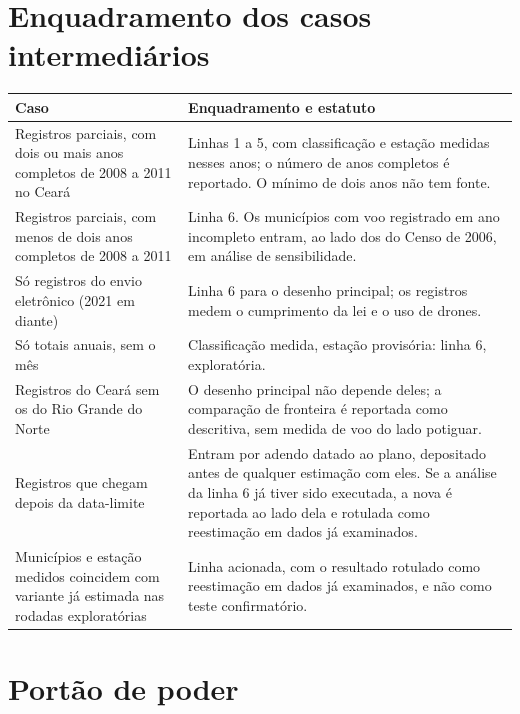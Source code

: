 \begin{apendicesenv}
\section{Enquadramento dos casos intermediários}

\begin{quadro}[htb]
\caption{\label{qua:casos}Casos que o Quadro~\ref{qua:regra} não nomeia}
\centering
\footnotesize
\begin{tabular}{@{}p{5.2cm}p{9.3cm}@{}}
\toprule
Caso & Enquadramento e estatuto \\
\midrule
Registros parciais, com dois ou mais anos completos de 2008 a 2011 no Ceará &
Linhas 1 a 5, com classificação e estação medidas nesses anos; o número de anos completos é reportado. O mínimo de dois anos não tem fonte. \\
Registros parciais, com menos de dois anos completos de 2008 a 2011 &
Linha 6. Os municípios com voo registrado em ano incompleto entram, ao lado dos do Censo de 2006, em análise de sensibilidade. \\
Só registros do envio eletrônico (2021 em diante) &
Linha 6 para o desenho principal; os registros medem o cumprimento da lei e o uso de drones. \\
Só totais anuais, sem o mês &
Classificação medida, estação provisória: linha 6, exploratória. \\
Registros do Ceará sem os do Rio Grande do Norte &
O desenho principal não depende deles; a comparação de fronteira é reportada como descritiva, sem medida de voo do lado potiguar. \\
Registros que chegam depois da data-limite &
Entram por adendo datado ao plano, depositado antes de qualquer estimação com eles. Se a análise da linha 6 já tiver sido executada, a nova é reportada ao lado dela e rotulada como reestimação em dados já examinados. \\
Municípios e estação medidos coincidem com variante já estimada nas rodadas exploratórias &
Linha acionada, com o resultado rotulado como reestimação em dados já examinados, e não como teste confirmatório. \\
\bottomrule
\end{tabular}
\end{quadro}

\section{Portão de poder}


\end{apendicesenv}
